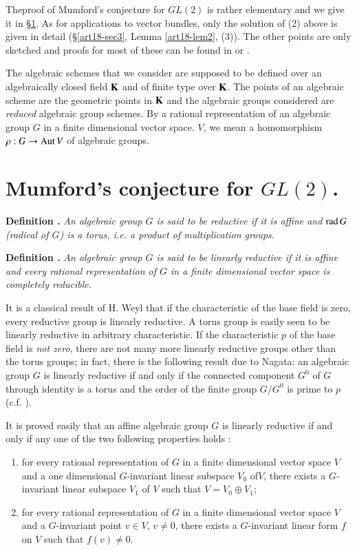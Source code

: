 The\pageoriginale proof of Mumford's conjecture for $GL(2)$ is rather elementary and we give it in \S\ref{art18-sec1}. As for applications to vector bundles, only the solution of (2) above is given in detail (\S\ref{art18-sec3}, Lemma \ref{art18-lem2}, (3)). The other points are only sketched and proofs for most of these can be found in \cite{art18-key5} or \cite{art18-key12}.

The algebraic schemes that we consider are supposed to be defined over an algebraically closed field $\mathbf{K}$ and of finite type over $\mathbf{K}$. The points of an algebraic scheme are the geometric points in $\mathbf{K}$ and the algebraic groups considered are {\em reduced} algebraic group schemes. By a rational representation of an algebraic group $G$ in a finite dimensional vector space. $V$, we mean a homomorphism $\rho:G\to \operatorname{\mathrm{Aut}} V$ of algebraic groups.

\section{Mumford's conjecture for \texorpdfstring{$GL(2)$}{GL2}.}\label{art18-sec1}

\noindent
{\bf Definition .\label{art18-defi1}}
{\em An algebraic group $G$ is said to be reductive if it is affine and $\operatorname{\mathrm{rad}} G$ (radical of $G$) is a torus, i.e. a product of multiplication groups.}

\medskip
\noindent
{\bf Definition .\label{art18-defi2}}
{\em An algebraic group $G$ is said to be linearly reductive if it is affine and every rational representation of $G$ in a finite dimensional vector space is completely reducible.}
\smallskip

It is a classical result of H. Weyl that if the characteristic of the base field is zero, every reductive group is linearly reductive. A torus group is easily seen to be linearly reductive in arbitrary characteristic. If the characteristic $p$ of the base field is {\em not zero}, there are not many more linearly reductive groups other than the torus groups; in fact, there is the following result due to Nagata: an algebraic group $G$ is linearly reductive if and only if the connected component $G^{0}$ of $G$ through identity is a torus and the order of the finite group $G/G^{0}$ is prime to $p$ (c.f. \cite{art18-key6}).

It is proved easily that an affine algebraic group $G$ is linearly reductive if and only if any one of the two following properties holds :
\begin{enumerate}
\renewcommand{\labelenumi}{(\theenumi)}
\item for every rational representation of $G$ in a finite dimensional vector space $V$ and a one dimensional $G$-invariant linear subspace $V_{0}$ of\pageoriginale $V$, there exists a $G$-invariant linear subspace $V_{1}$ of $V$ such that $V=V_{0}\oplus V_{1}$;

\item for every rational representation of $G$ in a finite dimensional vector space $V$ and a $G$-invariant point $v\in V$, $v\neq 0$, there exists a $G$-invariant linear form $f$ on $V$ such that $f(v)\neq 0$.
\end{enumerate}

